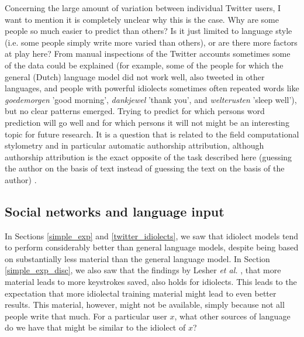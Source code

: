 \documentclass[11pt]{article}
\begin{document}
Concerning the large amount of variation between individual Twitter users, I want to mention it is completely unclear why this is the case. Why are some people so much easier to predict than others? Is it just limited to language style (i.e. some people simply write more varied than others), or are there more factors at play here? From manual inspections of the Twitter accounts sometimes some of the data could be explained (for example, some of the people for which the general (Dutch) language model did not work well, also tweeted in other languages, and people with powerful idiolects sometimes often repeated words like \emph{goedemorgen} 'good morning', \emph{dankjewel} 'thank you', and \emph{welterusten} 'sleep well'), but no clear patterns emerged. Trying to predict for which persons word prediction will go well and for which persons it will not might be an interesting topic for future research. It is a question that is related to the field computational stylometry and in particular automatic authorship attribution, although authorship attribution is the exact opposite of the task described here (guessing the author on the basis of text instead of guessing the text on the basis of the author) \cite{bagavandas+08}.

\subsection{Social networks and language input} \label{input_networks}

In Sections \ref{simple_exp} and \ref{twitter_idiolects}, we saw that idiolect models tend to perform considerably better than general language models, despite being based on substantially less material than the general language model. In Section \ref{simple_exp_disc}, we also saw that the findings by Lesher {\em et al.} , that more material leads to more keystrokes saved, also holds for idiolects. This leads to the expectation that more idiolectal training material might lead to even better results. This material, however, might not be available, simply because not all people write that much. For a particular user $x$, what other sources of language do we have that might be similar to the idiolect of $x$?
\end{document}
